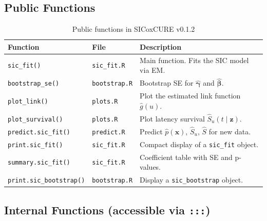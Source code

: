 \documentclass[12pt,a4paper]{article}
\begin{document}
\subsection{Public Functions}

\begin{longtable}{lll}
  \caption{Public functions in SICoxCURE v0.1.2}\\
  \toprule
  \textbf{Function} & \textbf{File} & \textbf{Description} \\
  \midrule
  \texttt{sic\_fit()} & \texttt{sic\_fit.R} &
    Main function. Fits the SIC model via EM. \\
  \texttt{bootstrap\_se()} & \texttt{bootstrap.R} &
    Bootstrap SE for $\hat{\boldsymbol{\gamma}}$
    and $\hat{\boldsymbol{\beta}}$. \\
  \texttt{plot\_link()} & \texttt{plots.R} &
    Plot the estimated link function $\hat{g}(u)$. \\
  \texttt{plot\_survival()} & \texttt{plots.R} &
    Plot latency survival $\hat{S}_u(t \mid \mathbf{z})$. \\
  \texttt{predict.sic\_fit()} & \texttt{predict.R} &
    Predict $\hat{p}(\mathbf{x})$, $\hat{S}_u$,
    $\hat{S}$ for new data. \\
  \texttt{print.sic\_fit()} & \texttt{sic\_fit.R} &
    Compact display of a \texttt{sic\_fit} object. \\
  \texttt{summary.sic\_fit()} & \texttt{sic\_fit.R} &
    Coefficient table with SE and p-values. \\
  \texttt{print.sic\_bootstrap()} & \texttt{bootstrap.R} &
    Display a \texttt{sic\_bootstrap} object. \\
  \bottomrule
\end{longtable}

\subsection{Internal Functions (accessible via \texttt{:::})}
\end{document}
